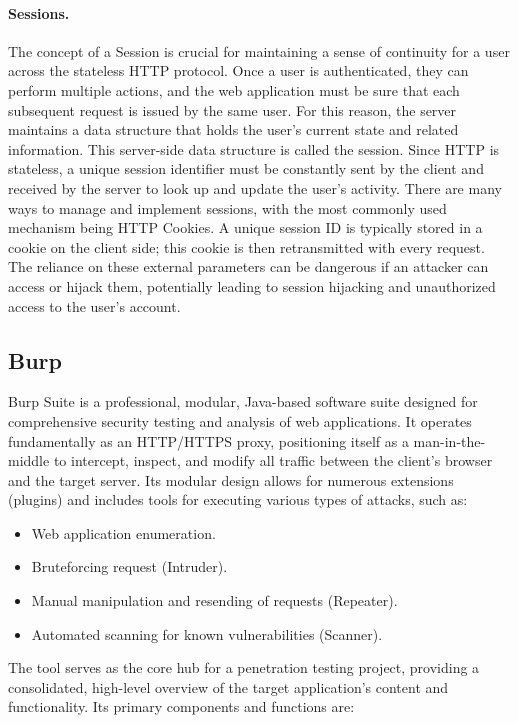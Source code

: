 \paragraph{Sessions.} The concept of a Session is crucial for maintaining a sense of continuity for a user across the stateless HTTP protocol. Once a user is authenticated, they can perform multiple actions, and the web application must be sure that each subsequent request is issued by the same user. For this reason, the server maintains a data structure that holds the user's current state and related information. This server-side data structure is called the session. Since HTTP is stateless, a unique session identifier must be constantly sent by the client and received by the server to look up and update the user's activity. There are many ways to manage and implement sessions, with the most commonly used mechanism being HTTP Cookies. A unique session ID is typically stored in a cookie on the client side; this cookie is then retransmitted with every request. The reliance on these external parameters can be dangerous if an attacker can access or hijack them, potentially leading to session hijacking and unauthorized access to the user's account.

\subsection{Burp}
Burp Suite is a professional, modular, Java-based software suite designed for comprehensive security testing and analysis of web applications. It operates fundamentally as an HTTP/HTTPS proxy, positioning itself as a man-in-the-middle to intercept, inspect, and modify all traffic between the client's browser and the target server. Its modular design allows for numerous extensions (plugins) and includes tools for executing various types of attacks, such as:

\begin{itemize}
    \item Web application enumeration.
    \item Bruteforcing request (Intruder).
    \item Manual manipulation and resending of requests (Repeater).
    \item Automated scanning for known vulnerabilities (Scanner).
\end{itemize}

The  tool serves as the core hub for a penetration testing project, providing a consolidated, high-level overview of the target application's content and functionality. Its primary components and functions are:

